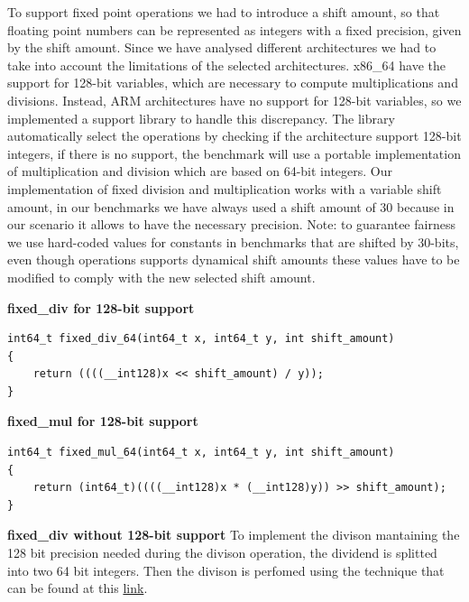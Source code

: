To support fixed point operations we had to introduce a shift amount, so that floating point numbers can be represented as integers with a fixed precision, given by the shift amount.\newline
Since we have analysed different architectures we had to take into account the limitations of the selected architectures.
x86\_64 have the support for 128-bit variables, which are necessary to compute multiplications and divisions. Instead, ARM architectures have no support for 128-bit variables, so we implemented a support library to handle this discrepancy.
The library automatically select the operations by checking if the architecture support 128-bit integers, if there is no support, the benchmark will use a portable implementation of multiplication and division which are based on 64-bit integers.\newline
Our implementation of fixed division and multiplication works with a variable shift amount, in our benchmarks we have always used a shift amount of 30 because in our scenario it allows to have the necessary precision.\newline
Note: to guarantee fairness we use hard-coded values for constants in benchmarks that are shifted by 30-bits, even though operations supports dynamical shift amounts these values have to be modified to comply with the new selected shift amount.\newline

\textbf{fixed\_div for 128-bit support}

\begin{lstlisting}
int64_t fixed_div_64(int64_t x, int64_t y, int shift_amount)
{
    return ((((__int128)x << shift_amount) / y));
}
\end{lstlisting}

\textbf{fixed\_mul for 128-bit support}

\begin{lstlisting}
int64_t fixed_mul_64(int64_t x, int64_t y, int shift_amount)
{
	return (int64_t)((((__int128)x * (__int128)y)) >> shift_amount);
}
\end{lstlisting}

\textbf{fixed\_div without 128-bit support}\newline
To implement the divison mantaining the 128 bit precision needed during the divison operation,  the dividend is splitted into two 64 bit integers. Then the divison is perfomed using the technique that can be found at this \href{https://codereview.stackexchange.com/questions/67962/mostly-portable-128-by-64-bit-division}{link}.\newline

